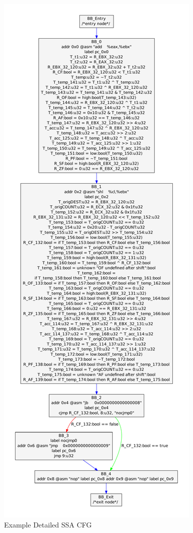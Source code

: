 \begin{figure}[!p]
  \begin{center}
    \includegraphics[height=.9\textheight]{chap-examples/ssacfg.pdf}
  \end{center}
  \caption{Example Detailed SSA CFG}
  \label{fig:ssacfg}
\end{figure}

